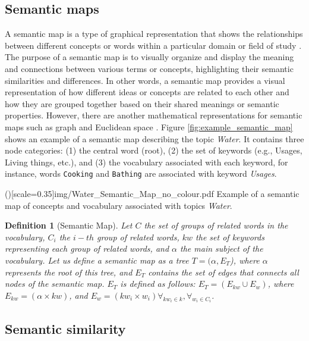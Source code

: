 \documentclass{ieeeaccess}
\newtheorem{Definition}{Definition}
\begin{document}
\subsection{Semantic maps}
A semantic map is a type of graphical representation 
that shows the relationships between different concepts 
or words within a particular domain or field of study
\cite{johnson1986semantic}. The  purpose of a semantic 
map is to visually organize and display the meaning and 
connections between various terms or concepts, 
highlighting their semantic similarities and 
differences. In other words, a semantic map provides a 
visual representation of how different ideas or 
concepts are related to each other and how they are
grouped together based on their shared meanings or 
semantic properties. However, there are another mathematical
representations for semantic maps such as graph and 
Euclidean space \cite{Croft2022}. Figure  
\ref{fig:example_semantic_map} shows an
example of a semantic map describing the topic 
\textit{Water}. It contains three node categories: (1) 
the central word (root), (2) the set of keywords 
(e.g., Usages, Living things, etc.), and (3) the
vocabulary associated with each keyword, for instance, 
words \texttt{Cooking} and \texttt{Bathing} are 
associated with keyword \textit{Usages}.

\Figure[h]()[scale=0.35]{img/Water_Semantic_Map_no_colour.pdf}
{Example of a semantic map of concepts and vocabulary  associated with
topics \textit{Water}.\label{fig:example_semantic_map}}

\begin{Definition}[Semantic Map]
Let $C$ the set of groups of related words in the
vocabulary, $C_{i}$ the $i-th$ group of related
words, $kw$ the set of keywords representing
each group of related words, and $\alpha$ the
main subject of the vocabulary. Let us define 
a semantic map as a tree $T = (\alpha, E_{T}$), 
where $\alpha$ represents the root of this tree,
and $E_{T}$ contains the set of edges that
connects all nodes of the semantic map. 
$E_{T}$ is defined as follows: 
$E_{T} = (E_{kw} \cup E_{w})$, where
$E_{kw} = (\alpha \times kw)$, and $E_{w} = (kw_{i} \times w_{i}) 
\forall_{kw_{i} \in k}, \forall_{w_{i} \in C_{i}}$.
\end{Definition}

\subsection{Semantic similarity}
\end{document}
